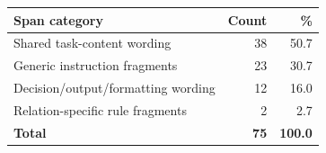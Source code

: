 \begin{tabular}{p{}rr}
\toprule
\textbf{Span category} & \textbf{Count} & \textbf{\%} \\
\midrule
Shared task-content wording          & 38 & 50.7 \\
Generic instruction fragments        & 23 & 30.7 \\
Decision/output/formatting wording   & 12 & 16.0 \\
Relation-specific rule fragments     &  2 &  2.7 \\
\midrule
\textbf{Total}                       & \textbf{75} & \textbf{100.0} \\
\bottomrule
\end{tabular}
